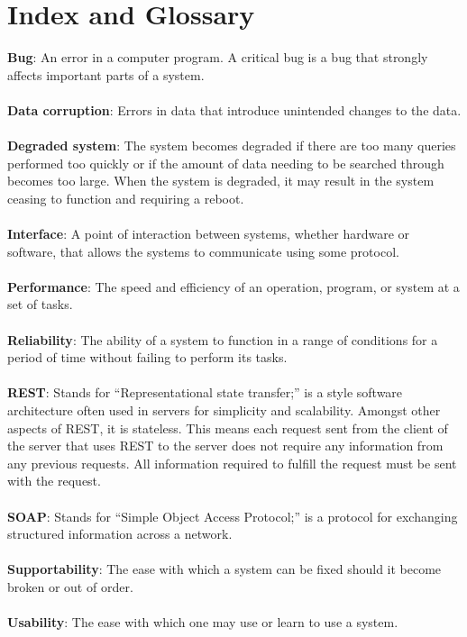 \documentclass{article}
\begin{document}
\section{Index and Glossary}
\textbf{Bug}: An error in a computer program. A critical bug is a bug that strongly affects important parts of a system.\\ \\
\textbf{Data corruption}: Errors in data that introduce unintended changes to the data.\\ \\
\textbf{Degraded system}: The system becomes degraded if there are too many queries performed too quickly or if the amount of data needing to be searched through becomes too large. When the system is degraded, it may result in the system ceasing to function and requiring a reboot.\\ \\
\textbf{Interface}: A point of interaction between systems, whether hardware or software, that allows the systems to communicate using some protocol.\\ \\
\textbf{Performance}: The speed and efficiency of an operation, program, or system at a set of tasks.\\ \\
\textbf{Reliability}: The ability of a system to function in a range of conditions for a period of time without failing to perform its tasks.\\ \\
\textbf{REST}: Stands for ``Representational state transfer;'' is a style software architecture often used in servers for simplicity and scalability. Amongst other aspects of REST, it is stateless. This means each request sent from the client of the server that uses REST to the server does not require any information from any previous requests. All information required to fulfill the request must be sent with the request.\\ \\
\textbf{SOAP}: Stands for ``Simple Object Access Protocol;'' is a protocol for exchanging structured information across a network.\\ \\
\textbf{Supportability}: The ease with which a system can be fixed should it become broken or out of order.\\ \\
\textbf{Usability}: The ease with which one may use or learn to use a system.
\end{document}
